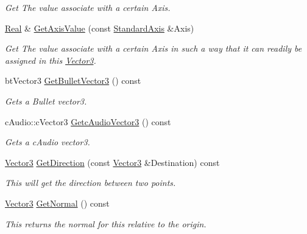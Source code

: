 \begin{DoxyCompactItemize}
\begin{DoxyCompactList}\small\item\em Get The value associate with a certain Axis. \item\end{DoxyCompactList}\item 
\hyperlink{namespaceMezzanine_a726731b1a7df72bf3583e4a97282c6f6}{Real} \& \hyperlink{classMezzanine_1_1Vector3_a794d3d9bffc086656e5bdf70525db72d}{GetAxisValue} (const \hyperlink{namespaceMezzanine_ab41a00a8c6a47b576dc987ec34e16ba1}{StandardAxis} \&Axis)
\begin{DoxyCompactList}\small\item\em Get The value associate with a certain Axis in such a way that it can readily be assigned in this \hyperlink{classMezzanine_1_1Vector3}{Vector3}. \item\end{DoxyCompactList}\item 
btVector3 \hyperlink{classMezzanine_1_1Vector3_ab9fb84bdbfe3bed9fd210a6ad1cee8b7}{GetBulletVector3} () const 
\begin{DoxyCompactList}\small\item\em Gets a Bullet vector3. \item\end{DoxyCompactList}\item 
cAudio::cVector3 \hyperlink{classMezzanine_1_1Vector3_abc23c3ed5b31db10992744bf789eb390}{GetcAudioVector3} () const 
\begin{DoxyCompactList}\small\item\em Gets a cAudio vector3. \item\end{DoxyCompactList}\item 
\hyperlink{classMezzanine_1_1Vector3}{Vector3} \hyperlink{classMezzanine_1_1Vector3_a707fd0329426f74b38b58d081c585eae}{GetDirection} (const \hyperlink{classMezzanine_1_1Vector3}{Vector3} \&Destination) const 
\begin{DoxyCompactList}\small\item\em This will get the direction between two points. \item\end{DoxyCompactList}\item 
\hyperlink{classMezzanine_1_1Vector3}{Vector3} \hyperlink{classMezzanine_1_1Vector3_a8683a3d640736b5dda63be4a656663a3}{GetNormal} () const 
\begin{DoxyCompactList}\small\item\em This returns the normal for this relative to the origin. \item\end{DoxyCompactList}\item 

\end{DoxyCompactItemize}
